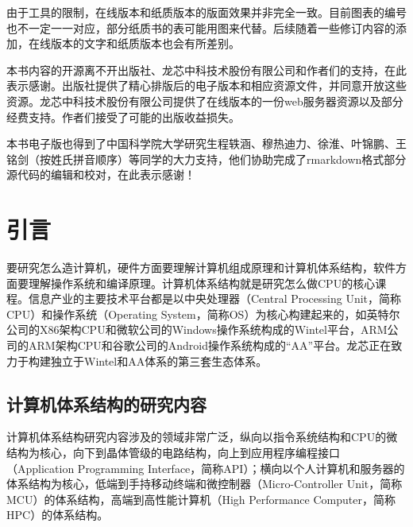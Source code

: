 \documentclass[]{ctexbook}
\begin{document}
由于工具的限制，在线版本和纸质版本的版面效果并非完全一致。目前图表的编号也不一定一一对应，部分纸质书的表可能用图来代替。后续随着一些修订内容的添加，在线版本的文字和纸质版本也会有所差别。

本书内容的开源离不开出版社、龙芯中科技术股份有限公司和作者们的支持，在此表示感谢。出版社提供了精心排版后的电子版本和相应资源文件，并同意开放这些资源。龙芯中科技术股份有限公司提供了在线版本的一份web服务器资源以及部分经费支持。作者们接受了可能的出版收益损失。

本书电子版也得到了中国科学院大学研究生程轶涵、穆热迪力、徐淮、叶锦鹏、王铭剑（按姓氏拼音顺序）等同学的大力支持，他们协助完成了rmarkdown格式部分源代码的编辑和校对，在此表示感谢！

\mainmatter

\hypertarget{ux5f15ux8a00}{%
\chapter{引言}\label{ux5f15ux8a00}}

要研究怎么造计算机，硬件方面要理解计算机组成原理和计算机体系结构，软件方面要理解操作系统和编译原理。计算机体系结构就是研究怎么做CPU的核心课程。信息产业的主要技术平台都是以中央处理器（Central Processing Unit，简称CPU）和操作系统（Operating System，简称OS）为核心构建起来的，如英特尔公司的X86架构CPU和微软公司的Windows操作系统构成的Wintel平台，ARM公司的ARM架构CPU和谷歌公司的Android操作系统构成的``AA''平台。龙芯正在致力于构建独立于Wintel和AA体系的第三套生态体系。

\hypertarget{ux8ba1ux7b97ux673aux4f53ux7cfbux7ed3ux6784ux7684ux7814ux7a76ux5185ux5bb9}{%
\section{计算机体系结构的研究内容}\label{ux8ba1ux7b97ux673aux4f53ux7cfbux7ed3ux6784ux7684ux7814ux7a76ux5185ux5bb9}}

计算机体系结构研究内容涉及的领域非常广泛，纵向以指令系统结构和CPU的微结构为核心，向下到晶体管级的电路结构，向上到应用程序编程接口（Application Programming Interface，简称API）；横向以个人计算机和服务器的体系结构为核心，低端到手持移动终端和微控制器（Micro-Controller Unit，简称MCU）的体系结构，高端到高性能计算机（High Performance Computer，简称HPC）的体系结构。
\end{document}
